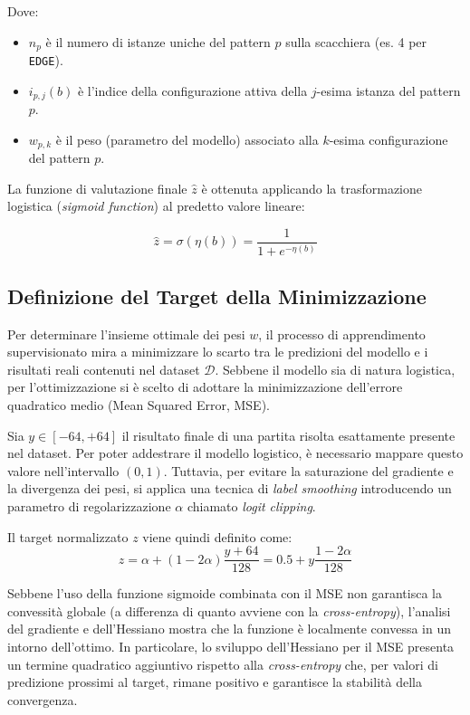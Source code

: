 Dove:
\begin{itemize}
    \item $n_p$ è il numero di istanze uniche del pattern $p$ sulla scacchiera (es. 4 per \texttt{EDGE}).
    \item $i_{p,j}(b)$ è l'indice della configurazione attiva della $j$-esima istanza del pattern $p$.
    \item $w_{p, k}$ è il peso (parametro del modello) associato alla $k$-esima configurazione del pattern $p$.
\end{itemize}

La funzione di valutazione finale $\hat{z}$ è ottenuta applicando la trasformazione logistica (\textit{sigmoid function}) al predetto valore lineare:

\begin{equation}
  \hat{z} = \sigma(\eta(b)) = \frac{1}{1 + e^{-\eta(b)}}
\end{equation}

\subsection{Definizione del  Target della Minimizzazione}

Per determinare l'insieme ottimale dei pesi $w$, il processo di apprendimento supervisionato mira a minimizzare lo scarto tra le predizioni del modello e i risultati reali contenuti nel dataset $\mathcal{D}$.
Sebbene il modello sia di natura logistica, per l'ottimizzazione si è scelto di adottare la minimizzazione dell'errore quadratico medio (Mean Squared Error, MSE).

Sia $y \in [-64, +64]$ il risultato finale di una partita risolta esattamente presente nel dataset. Per poter addestrare il modello logistico, è necessario mappare questo valore nell'intervallo $(0, 1)$.
Tuttavia, per evitare la saturazione del gradiente e la divergenza dei pesi, si applica una tecnica di \textit{label smoothing} introducendo
un parametro di regolarizzazione $\alpha$ chiamato \textit{logit clipping}. 

Il target normalizzato $z$ viene quindi definito come:
\begin{equation}
    z = \alpha + (1 - 2\alpha) \frac{y + 64}{128} = 0.5 + y \frac{1 - 2\alpha}{128}
\end{equation}

Sebbene l'uso della funzione sigmoide combinata con il MSE non garantisca la convessità globale (a differenza di quanto avviene con la \textit{cross-entropy}), l'analisi del gradiente e dell'Hessiano mostra che la funzione è localmente convessa in un intorno dell'ottimo. In particolare, lo sviluppo dell'Hessiano per il MSE presenta un termine quadratico aggiuntivo rispetto alla \textit{cross-entropy} che, per valori di predizione prossimi al target, rimane positivo e garantisce la stabilità della convergenza.

